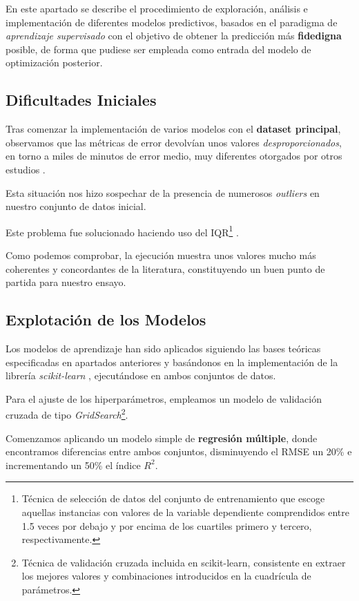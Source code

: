 En este apartado se describe el procedimiento de exploración, análisis e implementación de diferentes modelos predictivos, basados en el paradigma de \textit{aprendizaje supervisado} con el objetivo de obtener la predicción más \textbf{fidedigna} posible, de forma que pudiese ser empleada como entrada del modelo de optimización posterior.

\subsection{Dificultades Iniciales}

Tras comenzar la implementación de varios modelos con el \textbf{dataset principal}, observamos que las métricas de error devolvían unos valores \textit{desproporcionados}, en torno a miles de minutos de error medio, muy diferentes  otorgados por otros estudios \cite{ShahabiKargar2014PredictingSurgery}.

Esta situación nos hizo sospechar de la presencia de numerosos \textit{outliers} en nuestro conjunto de datos inicial. 

Este problema fue solucionado haciendo uso del IQR\footnote{Técnica de selección de datos del conjunto de entrenamiento que escoge aquellas instancias con valores de la variable dependiente comprendidos entre 1.5 veces por debajo y por encima de los cuartiles primero y tercero, respectivamente.} \cite{Bonthu2021DetectingOutliers}.

Como podemos comprobar, la ejecución muestra unos valores mucho más coherentes y concordantes de la literatura, constituyendo un buen punto de partida para nuestro ensayo.

\subsection{Explotación de los Modelos}

Los modelos de aprendizaje han sido aplicados siguiendo las bases teóricas especificadas en apartados anteriores y basándonos en la implementación de la librería \textit{scikit-learn} \cite{2021Scikit-LearnPython}, ejecutándose en ambos conjuntos de datos.

Para el ajuste de los hiperparámetros, empleamos un modelo de validación cruzada de tipo \textit{GridSearch}\footnote{Técnica de validación cruzada incluida en scikit-learn, consistente en extraer los mejores valores y combinaciones introducidos en la cuadrícula de parámetros.}.

Comenzamos aplicando un modelo simple de \textbf{regresión múltiple}, donde encontramos diferencias entre ambos conjuntos,  disminuyendo el RMSE un 20\% e incrementando un 50\% el índice $R^{2}$.

